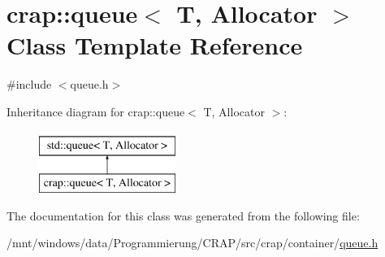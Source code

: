 \hypertarget{classcrap_1_1queue}{\section{crap\-:\-:queue$<$ T, Allocator $>$ Class Template Reference}
\label{classcrap_1_1queue}
}


{\ttfamily \#include $<$queue.\-h$>$}

Inheritance diagram for crap\-:\-:queue$<$ T, Allocator $>$\-:\begin{figure}[H]
\begin{center}
\leavevmode
\includegraphics[height=2.000000cm]{classcrap_1_1queue}
\end{center}
\end{figure}


The documentation for this class was generated from the following file\-:\begin{DoxyCompactItemize}
\item 
/mnt/windows/data/\-Programmierung/\-C\-R\-A\-P/src/crap/container/\hyperlink{queue_8h}{queue.\-h}\end{DoxyCompactItemize}
